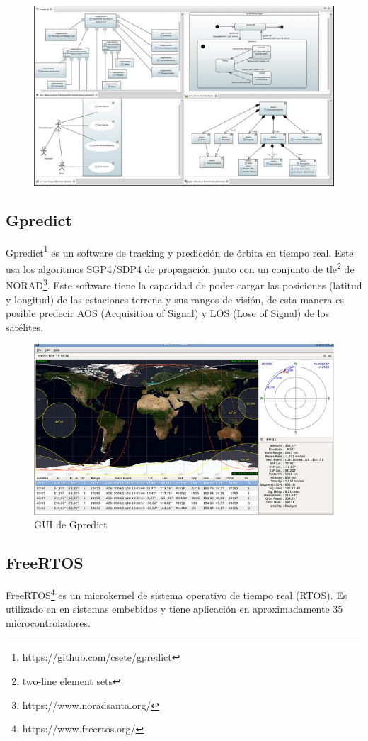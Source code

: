 \documentclass[12pt]{article}
\begin{document}
\begin{figure}[H]
	\centering
	\includegraphics[width=0.7\linewidth]{papyrus2}
	\caption{}
	\label{fig:papyrus2}
\end{figure}

\subsection{Gpredict}
Gpredict\footnote{https://github.com/csete/gpredict} es un software de tracking y predicción de órbita en tiempo real. Este usa los algoritmos SGP4/SDP4 de propagación junto con un conjunto de tle\footnote{two-line element sets} de NORAD\footnote{https://www.noradsanta.org/}. Este software tiene la capacidad de poder cargar las posiciones (latitud y longitud) de las estaciones terrena y sus rangos de visión, de esta manera es posible predecir AOS (Acquisition of Signal) y LOS (Lose of Signal) de los satélites.

\begin{figure}[H]
	\centering
	\includegraphics[width=0.7\linewidth]{gpredict}
	\caption{GUI de Gpredict}
	\label{fig:gpredict}
\end{figure}

\subsection{FreeRTOS}
FreeRTOS\footnote{https://www.freertos.org/} es un microkernel de sistema operativo de tiempo real (RTOS). Es utilizado en en sistemas embebidos y tiene aplicación en aproximadamente 35 microcontroladores. 
\end{document}
